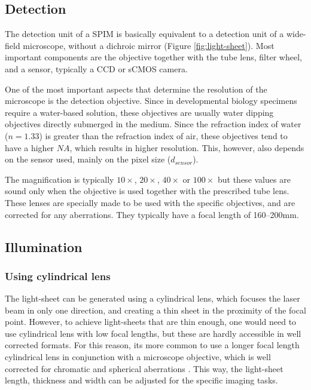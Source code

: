   \subsection{Detection}
    The detection unit of a SPIM is basically equivalent to a detection unit of a wide-field microscope, without a dichroic mirror (Figure \ref{fig:light-sheet}). Most important components are the objective together with the tube lens, filter wheel, and a sensor, typically a CCD or sCMOS camera.

    One of the most important aspects that determine the resolution of the microscope is the detection objective. Since in developmental biology specimens require a water-based solution, these objectives are usually water dipping objectives directly submerged in the medium. Since the refraction index of water ($n=1.33$) is greater than the refraction index of air, these objectives tend to have a higher $NA$, which results in higher resolution. This, however, also depends on the sensor used, mainly on the pixel size ($d_{sensor}$).

    The magnification is typically $10\times$, $20\times$, $40\times$ or $100\times$ but these values are sound only when the objective is used together with the prescribed tube lens. These lenses are specially made to be used with the specific objectives, and are corrected for any aberrations. They typically have a focal length of 160--200mm.


  \subsection{Illumination}

    \subsubsection{Using cylindrical lens}
      The light-sheet can be generated using a cylindrical lens, which focuses the laser beam in only one direction, and creating a thin sheet in the proximity of the focal point. However, to achieve light-sheets that are thin enough, one would need to use cylindrical lens with low focal lengths, but these are hardly accessible in well corrected formats. For this reason, its more common to use a longer focal length cylindrical lens in conjunction with a microscope objective, which is well corrected for chromatic and spherical aberrations \cite{greger_basic_2007}. This way, the light-sheet length, thickness and width can be adjusted for the specific imaging tasks.

